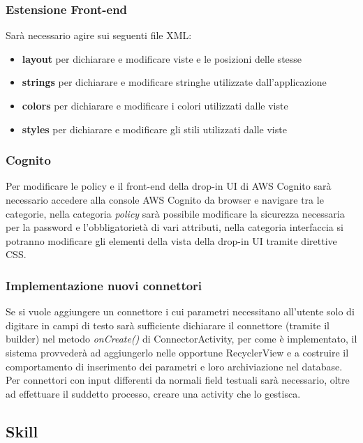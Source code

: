 \subsubsection{Estensione Front-end}
Sarà necessario agire sui seguenti file XML:
\begin{itemize}
\item \textbf{layout} per dichiarare e modificare viste e le posizioni delle stesse
\item \textbf{strings} per dichiarare e modificare stringhe utilizzate dall'applicazione
\item \textbf{colors} per dichiarare e modificare i colori utilizzati dalle viste
\item \textbf{styles} per dichiarare e modificare gli stili utilizzati dalle viste
\end{itemize}

\subsubsection{Cognito}
Per modificare le policy e il front-end della drop-in UI di AWS Cognito sarà necessario accedere alla console AWS Cognito da browser e navigare tra le categorie, nella categoria \emph{policy} sarà possibile modificare la sicurezza necessaria per la password e l'obbligatorietà di vari attributi, nella categoria interfaccia si potranno modificare gli elementi della vista della drop-in UI tramite direttive CSS.

\subsubsection{Implementazione nuovi connettori}
Se si vuole aggiungere un connettore i cui parametri necessitano all'utente solo di digitare in campi di testo sarà sufficiente dichiarare il connettore (tramite il builder) nel metodo \emph{onCreate()} di ConnectorActivity, per come è implementato, il sistema provvederà ad aggiungerlo nelle opportune RecyclerView e a costruire il comportamento di inserimento dei parametri e loro archiviazione nel database.
Per connettori con input differenti da normali field testuali sarà necessario, oltre ad effettuare il suddetto processo, creare una activity che lo gestisca.

\subsection{Skill}
\label{sec:estensioni-skill}
